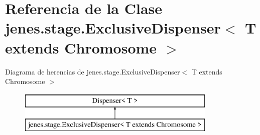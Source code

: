 \hypertarget{classjenes_1_1stage_1_1_exclusive_dispenser_3_01_t_01extends_01_chromosome_01_4}{\section{Referencia de la Clase jenes.\-stage.\-Exclusive\-Dispenser$<$ T extends Chromosome $>$}
\label{classjenes_1_1stage_1_1_exclusive_dispenser_3_01_t_01extends_01_chromosome_01_4}
}
Diagrama de herencias de jenes.\-stage.\-Exclusive\-Dispenser$<$ T extends Chromosome $>$\begin{figure}[H]
\begin{center}
\leavevmode
\includegraphics[height=2.000000cm]{classjenes_1_1stage_1_1_exclusive_dispenser_3_01_t_01extends_01_chromosome_01_4}
\end{center}
\end{figure}
